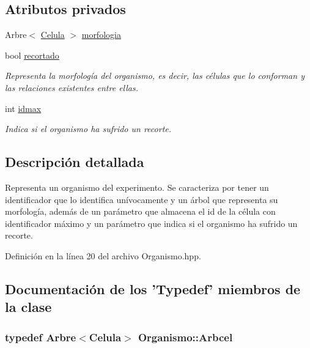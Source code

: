 \subsection*{Atributos privados}
\begin{DoxyCompactItemize}
\item 
Arbre$<$ \hyperlink{class_celula}{Celula} $>$ \hyperlink{class_organismo_a6139c2cd4bf552831772ec94b36fcf39}{morfologia}
\item 
bool \hyperlink{class_organismo_ab191bedf8c3fb1e6e21e0d69dd35437f}{recortado}
\begin{DoxyCompactList}\small\item\em Representa la morfología del organismo, es decir, las células que lo conforman y las relaciones existentes entre ellas. \end{DoxyCompactList}\item 
int \hyperlink{class_organismo_ae64c038f5e9a19d5c7d858a2b0fb58ee}{idmax}
\begin{DoxyCompactList}\small\item\em Indica si el organismo ha sufrido un recorte. \end{DoxyCompactList}\end{DoxyCompactItemize}


\subsection{Descripción detallada}
Representa un organismo del experimento. Se caracteriza por tener un identificador que lo identifica unívocamente y un árbol que representa su morfología, además de un parámetro que almacena el id de la célula con identificador máximo y un parámetro que indica si el organismo ha sufrido un recorte. 

Definición en la línea 20 del archivo Organismo.\-hpp.



\subsection{Documentación de los 'Typedef' miembros de la clase}
\hypertarget{class_organismo_a6d28459b85f211994ba446ba304fa141}{
\subsubsection[{Arbcel}]{\setlength{\rightskip}{0pt plus 5cm}typedef Arbre$<${\bf Celula}$>$ {\bf Organismo\-::\-Arbcel}\hspace{0.3cm}{\ttfamily [private]}}}\label{class_organismo_a6d28459b85f211994ba446ba304fa141}


